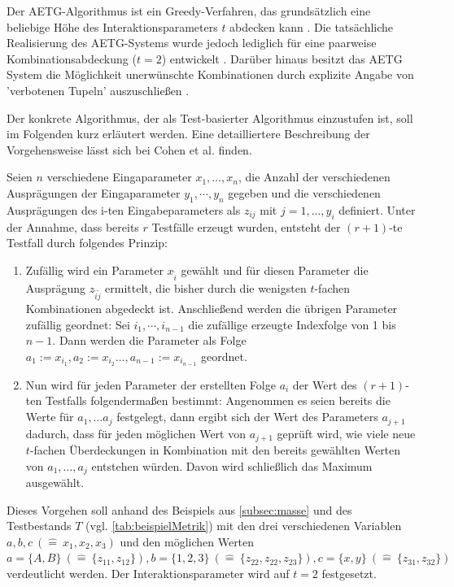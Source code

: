 Der AETG-Algorithmus ist ein Greedy-Verfahren, das grundsätzlich eine beliebige Höhe des Interaktionsparameters $t$ abdecken kann \cite{cohen1997aetg}. Die tatsächliche Realisierung des AETG-Systems wurde jedoch lediglich für eine paarweise Kombinationsabdeckung ($t = 2$) entwickelt \cite{khalsa2014orchestrated}. Darüber hinaus besitzt das AETG System die Möglichkeit unerwünschte Kombinationen durch explizite Angabe von 'verbotenen Tupeln' auszuschließen \cite{cohen1997aetg, khalsa2014orchestrated}.

Der konkrete Algorithmus, der als Test-basierter Algorithmus einzustufen ist, soll im Folgenden kurz erläutert werden. Eine detailliertere Beschreibung der Vorgehensweise lässt sich bei Cohen et al. \cite{cohen1997aetg} finden. 

Seien $n$ verschiedene Eingaparameter $x_1, \dots, x_n$, die Anzahl der verschiedenen Ausprägungen der Eingaparameter  $y_1, \cdots, y_n$ gegeben und die verschiedenen Ausprägungen des i-ten Eingabeparameters als $z_{ij}$ mit $j = 1,...,y_i$ definiert. Unter der Annahme, dass bereits $r$ Testfälle erzeugt wurden, entsteht der $(r+1)$-te Testfall durch folgendes Prinzip:
\begin{enumerate}
\item Zufällig wird ein Parameter $x_{\tilde{i}}$ gewählt und für diesen Parameter die Ausprägung $z_{\tilde{i}\tilde{j}}$ ermittelt, die bisher durch die wenigsten $t$-fachen Kombinationen abgedeckt ist. Anschließend werden die übrigen Parameter zufällig geordnet: Sei $i_1, \cdots, i_{n-1}$ die zufällige erzeugte Indexfolge von 1 bis $n-1$. Dann werden die Parameter als Folge $a_1 := x_{i_1}, a_2 := x_{i_2}  \dots, a_{n-1} := x_{i_{n-1}}$ geordnet.
\item Nun wird für jeden Parameter der erstellten Folge $a_i$ der Wert des $(r+1)$-ten Testfalls folgendermaßen bestimmt: Angenommen es seien bereits die Werte für $a_1, \dots a_j$ festgelegt, dann ergibt sich der Wert des Parameters $a_{j+1}$ dadurch, dass für jeden möglichen Wert von $a_{j+1}$ geprüft wird, wie viele neue $t$-fachen Überdeckungen in Kombination mit den bereits gewählten Werten von $a_1, \dots, a_j$ entstehen würden. Davon wird schließlich das Maximum ausgewählt.
\end{enumerate}

Dieses Vorgehen soll anhand des Beispiels aus \autoref{subsec:masse} und des Testbestands $T$ (vgl. \autoref{tab:beispielMetrik}) mit den drei verschiedenen Variablen $a,b,c ~ (\hat{=} ~ x_1, x_2, x_3)$ und den möglichen Werten $a = \{A,B\} ~ (\hat{=} ~ \{z_{11}, z_{12}\}), b = \{1,2,3\} ~ (\hat{=} ~ \{z_{22}, z_{22}, z_{23}\}), c = \{x,y\} ~ (\hat{=} ~ \{z_{31}, z_{32}\})$ verdeutlicht werden. Der Interaktionsparameter wird auf $t=2$ festgesetzt. 

